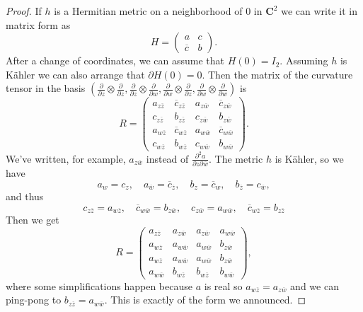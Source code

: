 \documentclass[10pt,a4paper]{amsart}
\theoremstyle{definition}
\def\ov#1{\overline{#1}}
\newcommand{\kk}[1]{\mathbf{#1}}
\begin{document}
\begin{proof}
If $h$ is a Hermitian metric on a neighborhood of $0$ in $\kk C^2$
we can write it in matrix form as
$$
H = \begin{pmatrix}
a & c
\\
\ov c & b
\end{pmatrix}.
$$
After a change of coordinates, we can assume that $H(0) = I_2$.
Assuming $h$ is K\"ahler we can also arrange that $\partial H(0) = 0$.
Then the matrix of the curvature tensor in the basis
\def\tg#1#2{\frac{\partial}{\partial #1} \otimes \frac{\partial}{\partial #2}}
$(\tg zz, \tg zw, \tg wz, \tg ww)$
is
$$
R = \begin{pmatrix}
a_{z \ov z} & \ov c_{z \ov z} & a_{z \ov w} & \ov c_{z \ov w}
\\
c_{z \ov z} & b_{z \ov z} & c_{z \ov w} & b_{z \ov w}
\\
a_{w \ov z} & \ov c_{w \ov z} & a_{w \ov w} & \ov c_{w \ov w}
\\
c_{w \ov z} & b_{w \ov z} & c_{w \ov w} & b_{w \ov w}
\end{pmatrix}.
$$
We've written, for example, $a_{z \ov w}$ instead of $\frac{\partial^2 a}{\partial z \partial \ov w}$.
The metric $h$ is K\"ahler, so we have
$$
a_w = c_{z},
\quad
a_{\ov w} = \ov c_{\ov z},
\quad
b_z = \ov c_w,
\quad
b_{\ov z} = c_{\ov w},
$$
and thus
$$
c_{z \ov z} = a_{w \ov z},
\quad
\ov c_{w \ov w} = b_{z \ov w},
\quad
c_{z \ov w} = a_{w \ov w},
\quad
\ov c_{w \ov z} = b_{z \ov z}
$$
Then we get
$$
R = \begin{pmatrix}
a_{z \ov z} & a_{z \ov w} & a_{z \ov w} & a_{w \ov w}
\\
a_{w \ov z} & a_{w \ov w} & a_{w \ov w} & b_{z \ov w}
\\
a_{w \ov z} & a_{w \ov w} & a_{w \ov w} & b_{z \ov w}
\\
a_{w \ov w} & b_{w \ov z} & b_{w \ov z} & b_{w \ov w}
\end{pmatrix},
$$
where some simplifications happen because $a$ is real so $a_{w \ov z} =
a_{z \ov w}$ and we can ping-pong to $b_{z \ov z} = a_{w \ov w}$.
This is exactly of the form we announced.


\end{proof}
\end{document}
